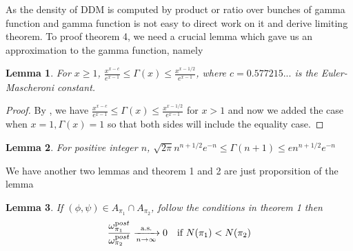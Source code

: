 \documentclass[aoas,preprint]{imsart}
\newtheorem{lemma}{Lemma}
\begin{document}

As the density of DDM is computed by product or ratio over bunches of gamma function and gamma function is not easy to direct work on it and derive limiting theorem.
To proof theorem 4, we need a crucial lemma which gave us an approximation to the gamma function, namely

\begin{lemma}
For $x \geq 1$, $\frac{x^{x - c}}{e^{x - 1}} \leq \Gamma(x) \leq \frac{x^{x-1/2}}{e^{x - 1}}$, where $c = 0.577215...$ is the Euler-Mascheroni constant.
\end{lemma}

\begin{proof}
By \citep{ineq},  we have $\frac{x^{x - c}}{e^{x - 1}} \leq \Gamma(x) \leq \frac{x^{x-1/2}}{e^{x - 1}}$ for $x > 1$ and now we added the case when $x = 1, \Gamma(x) = 1$ so that both sides will include the equality case. 
\end{proof}


\begin{lemma}
For positive integer $n$, $\sqrt{2\pi} n^{n + 1/2}e^{-n} \leq \Gamma(n + 1) \leq e n^{n + 1/2}e^{-n}$ 
\end{lemma}



We have another two lemmas and theorem 1 and 2 are just proporsition of the lemma
\begin{lemma}
 If $(\phi, \psi) \in A_{\pi_1} \cap A_{\pi_2}$, follow the conditions in theorem 1 then 
 \begin{eqnarray*}
    \frac{\omega_{\pi_1}^{\text post}}{\omega_{\pi_2}^{\text post}} \xrightarrow[n\rightarrow\infty]{\text{a.s.}} 0 \quad \text{if } N(\pi_1) < N(\pi_2)\\
 \end{eqnarray*}
\end{lemma}
\end{document}
